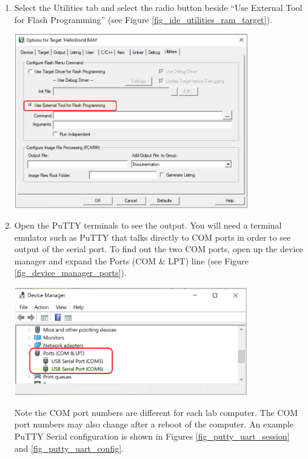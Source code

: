 \begin{enumerate}
        \item Select the Utilities tab and select the radio button beside ``Use External Tool for Flash Programming'' (see Figure \ref{fig_ide_utilities_ram_target}).\par  

          \begin{minipage}{\linewidth}
            \centering
            \includegraphics[width=4in]{figure/uv5/IDE_utilities_ram_target}
            \label{fig_ide_utilities_ram_target}
          \end{minipage}

        \item Open the PuTTY terminals to see the output. You will need a terminal emulator such as PuTTY that talks directly to COM ports in order to see output of the serial port. To find out the two COM ports, open up the device manager and expand the Ports (COM \& LPT) line (see Figure \ref{fig_device_manager_ports}). \par

          \begin{minipage}{\linewidth}
            \centering
            \includegraphics[width=4in]{figure/device_manager_ports_rc}
            \label{fig_device_manager_ports}
          \end{minipage}
          Note the COM port numbers are different for each lab computer. The COM port numbers may also change after a reboot of the computer.
  An example PuTTY Serial configuration is shown in Figures \ref{fig_putty_uart_session} and \ref{fig_putty_uart_config}.


\end{enumerate}
